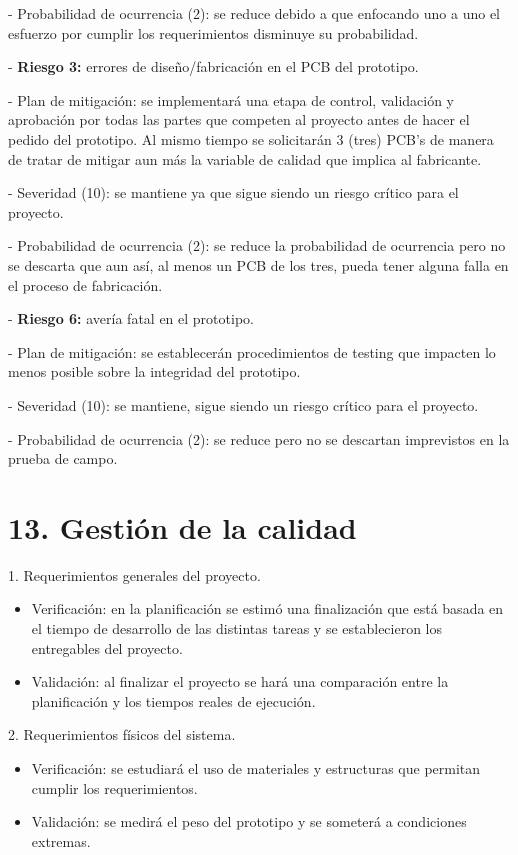 \documentclass[11pt]{charter}
\begin{document}
	- Probabilidad de ocurrencia (2): se reduce debido a que enfocando uno a uno el esfuerzo por cumplir los requerimientos disminuye su probabilidad.

- \textbf{Riesgo 3:} errores de diseño/fabricación en el PCB del prototipo.
	
	- Plan de mitigación: se implementará una etapa de control, validación y aprobación por todas las partes que competen al proyecto antes de hacer el pedido del prototipo. Al mismo tiempo se solicitarán 3 (tres) PCB's de manera de tratar de mitigar aun más la variable de calidad que implica al fabricante. 
	
	- Severidad (10): se mantiene ya que sigue siendo un riesgo crítico para el proyecto. 
	
	- Probabilidad de ocurrencia (2): se reduce la probabilidad de ocurrencia pero no se descarta que aun así, al menos un PCB de los tres, pueda tener alguna falla en el proceso de fabricación. 

- \textbf{Riesgo 6:} avería fatal en el prototipo.
	
	- Plan de mitigación: se establecerán procedimientos de testing que impacten lo menos posible sobre la integridad del prototipo.
	
	- Severidad (10): se mantiene, sigue siendo un riesgo crítico para el proyecto.  
	
	- Probabilidad de ocurrencia (2): se reduce pero no se descartan imprevistos en la prueba de campo. 
	
\section{13. Gestión de la calidad}
\label{sec:calidad}

1. Requerimientos generales del proyecto.
\begin{itemize}
	\item Verificación: en la planificación se estimó una finalización que está basada en el tiempo de desarrollo de las distintas tareas y se establecieron los entregables del proyecto.
	\item Validación: al finalizar el proyecto se hará una comparación entre la planificación y los tiempos reales de ejecución. 
\end{itemize}

2. Requerimientos físicos del sistema.
\begin{itemize}
	\item Verificación: se estudiará el uso de materiales y estructuras que permitan cumplir los requerimientos.  
	\item Validación: se medirá el peso del prototipo y se someterá a condiciones extremas. 
\end{itemize}
\end{document}
